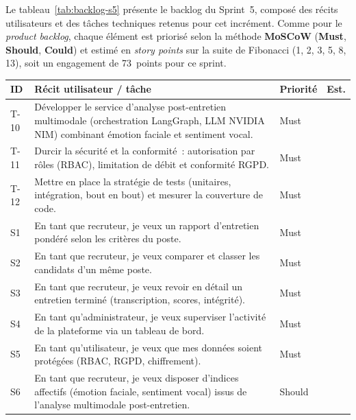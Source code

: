 Le tableau~\ref{tab:backlog-s5} présente le backlog du Sprint~5, composé des récits utilisateurs et des tâches techniques retenus pour cet incrément. Comme pour le \textit{product backlog}, chaque élément est priorisé selon la méthode \textbf{MoSCoW} (\textbf{Must}, \textbf{Should}, \textbf{Could}) et estimé en \textit{story points} sur la suite de Fibonacci (1, 2, 3, 5, 8, 13), soit un engagement de 73~points pour ce sprint.

\begin{table}[H]
  \centering
  \footnotesize
  \renewcommand{\arraystretch}{1.3}
  \setlength{\tabcolsep}{5pt}
  \begin{tabularx}{\textwidth}{|>{\centering\arraybackslash}p{1.1cm}|>{\raggedright\arraybackslash}X|>{\centering\arraybackslash}p{1.7cm}|>{\centering\arraybackslash}p{0.9cm}|}
    \hline
    \rowcolor{blue!10}
    \textbf{ID} & \textbf{Récit utilisateur / tâche} & \textbf{Priorité} & \textbf{Est.} \\
    \hline
    T-10 & Développer le service d'analyse post-entretien multimodale (orchestration LangGraph, LLM NVIDIA NIM) combinant émotion faciale et sentiment vocal. & Must & 8 \\
    \hline
    T-11 & Durcir la sécurité et la conformité~: autorisation par rôles (RBAC), limitation de débit et conformité RGPD. & Must & 8 \\
    \hline
    T-12 & Mettre en place la stratégie de tests (unitaires, intégration, bout en bout) et mesurer la couverture de code. & Must & 5 \\
    \hline
    S1 & En tant que recruteur, je veux un rapport d'entretien pondéré selon les critères du poste. & Must & 8 \\
    \hline
    S2 & En tant que recruteur, je veux comparer et classer les candidats d'un même poste. & Must & 8 \\
    \hline
    S3 & En tant que recruteur, je veux revoir en détail un entretien terminé (transcription, scores, intégrité). & Must & 5 \\
    \hline
    S4 & En tant qu'administrateur, je veux superviser l'activité de la plateforme via un tableau de bord. & Must & 5 \\
    \hline
    S5 & En tant qu'utilisateur, je veux que mes données soient protégées (RBAC, RGPD, chiffrement). & Must & 5 \\
    \hline
    S6 & En tant que recruteur, je veux disposer d'indices affectifs (émotion faciale, sentiment vocal) issus de l'analyse multimodale post-entretien. & Should & 5 \\

\end{tabularx}
\end{table}
